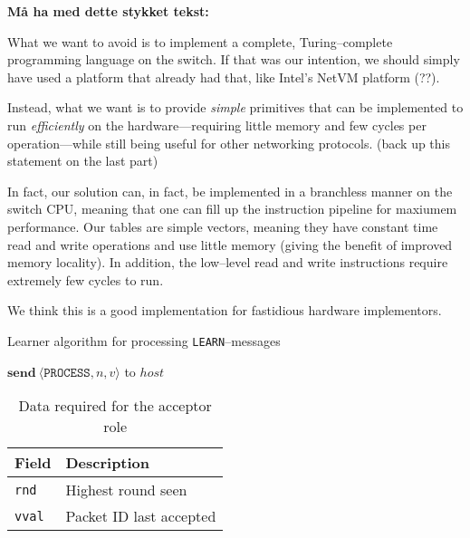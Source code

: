 \textbf{Må ha med dette stykket tekst:}

What we want to avoid is to implement a complete, Turing--complete
programming language on the switch.  If that was our intention, we should
simply have used a platform that already had that, like Intel's NetVM
platform (??).

Instead, what we want is to provide \textit{simple} primitives that can be
implemented to run \textit{efficiently} on the hardware---requiring little
memory and few cycles per operation---while still being useful for other
networking protocols. (back up this statement on the last part)

In fact, our solution can, in fact, be implemented in a branchless manner on the
switch CPU, meaning that one can fill up the instruction pipeline for
maxiumem performance.  Our tables are simple vectors, meaning they
have constant time read and write operations and use little memory
(giving the benefit of improved memory locality).  In addition, the
low--level read and write instructions require extremely few cycles to run.

We think this is a good implementation for fastidious hardware implementors.

\begin{algorithm}[H]
  \caption{Learner algorithm for processing \texttt{LEARN}--messages}
  \label{paxos.algorithm.learner}
  \begin{algorithmic}
        \State $\textbf{send}~\langle \texttt{PROCESS}, n, v \rangle$ to $host$
      \EndForIn
    \EndOn
  \end{algorithmic}
\end{algorithm}

\begin{table}[H]
\begin{tabular}{|l|l|}
\hline \textbf{Field} & \textbf{Description} \\
\hline \texttt{rnd} & Highest round seen \\
\hline \texttt{vval} & Packet ID last accepted \\
\hline
\end{tabular}
\caption{Data required for the acceptor role}
\label{paxos.acceptor.fields}
\end{table}

